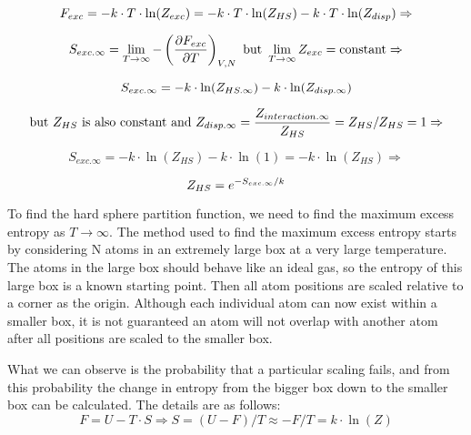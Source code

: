 \begin{equation}\label{eq:MCHS2}
\newline F_{exc}=-k\cdot T\cdot \ln(Z_{exc})=-k\cdot T\cdot \ln(Z_{HS})-k\cdot T\cdot \ln(Z_{disp})\Rightarrow 
\end{equation}

\begin{equation}\label{eq:MCHS3}
\newline S_{exc.\infty}=\lim_{T\to\infty}-\left ( \frac{\partial F_{exc}}{\partial T} \right ) _{V,N} \text{ but }\lim_{T\to\infty}Z_{exc}=\text{constant}\Rightarrow
\end{equation}

\begin{equation}\label{eq:MCHS4}
\newline S_{exc.\infty}=-k\cdot \ln(Z_{HS.\infty})-k\cdot \ln(Z_{disp.\infty})
\end{equation}

\begin{equation}\label{eq:MCHS5}
\newline \text{but }Z_{HS}\text{ is also constant and }Z_{disp.\infty}=\frac{Z_{interaction.\infty}}{Z_{HS}}=Z_{HS}/Z_{HS}=1 \Rightarrow
\end{equation}

\begin{equation}\label{eq:MCHS6}
S_{exc.\infty}=-k\cdot \ln(Z_{HS})-k\cdot \ln(1)=-k\cdot \ln(Z_{HS}) \Rightarrow
\end{equation}

\begin{equation}\label{eq:MCHS7}
\newline Z_{HS}=e^{-S_{exc.\infty}/k}
\end{equation}

To find the hard sphere partition function, we need to find the maximum excess entropy as $T\to\infty$. The method used to find the maximum excess entropy starts by considering N atoms in an extremely large box at a very large temperature. The atoms in the large box should behave like an ideal gas, so the entropy of this large box is a known starting point. Then all atom positions are scaled relative to a corner as the origin. Although each individual atom can now exist within a smaller box, it is not guaranteed an atom will not overlap with another atom after all positions are scaled to the smaller box.

What we can observe is the probability that a particular scaling fails, and from this probability the change in entropy from the bigger box down to the smaller box can be calculated. The details are as follows:
\begin{equation}\label{eq:MCHS8}
F=U-T\cdot S \Rightarrow  S=(U-F)/T\approx -F/T=k\cdot \ln(Z)
\end{equation}

